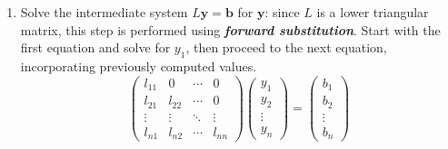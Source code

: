 \begin{enumerate}[label=\textcolor{Green3}{\textbf{\arabic*.}}]
\begin{enumerate}
        \item Solve the intermediate system $L\mathbf{y} = \mathbf{b}$ for $\mathbf{y}$: since $L$ is a lower triangular matrix, this step is performed using \textbf{\emph{forward substitution}}. Start with the first equation and solve for $y_{1}$, then proceed to the next equation, incorporating previously computed values.
        \begin{equation*}
            \begin{pmatrix}
                l_{11} & 0      & \cdots & 0      \\
                l_{21} & l_{22} & \cdots & 0      \\
                \vdots & \vdots & \ddots & \vdots \\
                l_{n1} & l_{n2} & \cdots & l_{nn}
            \end{pmatrix}
            \begin{pmatrix}
                y_{1} \\ y_{2} \\ \vdots \\ y_{n}
            \end{pmatrix}
            =
            \begin{pmatrix}
                b_{1} \\ b_{2} \\ \vdots \\ b_{n}
            \end{pmatrix}
        \end{equation*}


\end{enumerate}
\end{enumerate}
